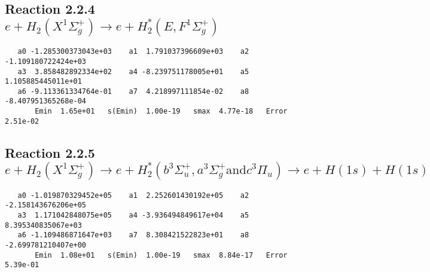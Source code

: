 \documentclass[12pt]{article}
\begin{document}
\newpage
\subsection{
Reaction 2.2.4 $e + H_2(X^1\Sigma_g^+) \rightarrow e + H_2^*(E,F^1\Sigma_g^+)$}














\begin{small}\begin{verbatim}
   a0 -1.285300373043e+03    a1  1.791037396609e+03    a2 -1.109180722424e+03
   a3  3.858482892334e+02    a4 -8.239751178005e+01    a5  1.105885445011e+01
   a6 -9.113361334764e-01    a7  4.218997111854e-02    a8 -8.407951365268e-04
       Emin  1.65e+01   s(Emin)  1.00e-19   smax  4.77e-18   Error  2.51e-02
\end{verbatim}\end{small}




\newpage
\subsection{
Reaction 2.2.5 $e +H_2(X^1\Sigma_g^+) \rightarrow 
e + H_2^*(b^3\Sigma_u^+, a^3\Sigma_g^+ \mbox{and} c^3\Pi_u)
\rightarrow e + H(1s) + H(1s)$}






%








\begin{small}\begin{verbatim}
   a0 -1.019870329452e+05    a1  2.252601430192e+05    a2 -2.158143676206e+05
   a3  1.171042848075e+05    a4 -3.936494849617e+04    a5  8.395340835067e+03
   a6 -1.109486871647e+03    a7  8.308421522823e+01    a8 -2.699781210407e+00
       Emin  1.08e+01   s(Emin)  1.00e-19   smax  8.84e-17   Error  5.39e-01
\end{verbatim}\end{small}
\end{document}
